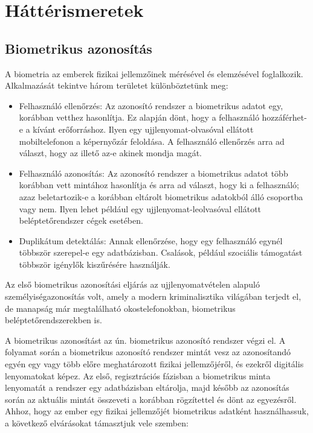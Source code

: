 \chapter{Háttérismeretek}

\section{Biometrikus azonosítás}

A biometria az emberek fizikai jellemzőinek mérésével és elemzésével foglalkozik. Alkalmazását tekintve három területet különböztetünk meg:

\begin{itemize}
	\item Felhasználó ellenőrzés: Az azonosító rendszer a biometrikus adatot egy, korábban vetthez hasonlítja. Ez alapján dönt, hogy a felhasználó hozzáférhet-e a kívánt erőforráshoz. Ilyen egy ujjlenyomat-olvasóval ellátott mobiltelefonon a képernyőzár feloldása. A felhasználó ellenőrzés arra ad választ, hogy az illető az-e akinek mondja magát.
	\item Felhasználó azonosítás: Az azonosító rendszer a biometrikus adatot több korábban vett mintához hasonlítja és arra ad választ, hogy ki a felhasználó; azaz beletartozik-e a korábban eltárolt biometrikus adatokból álló csoportba vagy nem. Ilyen lehet például egy ujjlenyomat-leolvasóval ellátott beléptetőrendszer cégek esetében.
	\item Duplikátum detektálás: Annak ellenőrzése, hogy egy felhasználó egynél többször szerepel-e egy adatbázisban. Csalások, például szociális támogatást többször igénylők kiszűrésére használják.
\end{itemize}

Az első biometrikus azonosítási eljárás az ujjlenyomatvételen alapuló személyiségazonosítás volt, amely a modern kriminalisztika világában terjedt el, de manapság már megtalálható okostelefonokban, biometrikus beléptetőrendszerekben is.

A biometrikus azonosítást az ún. biometrikus azonosító rendszer végzi el. A folyamat során a biometrikus azonosító rendszer mintát vesz az azonosítandó egyén egy vagy több előre meghatározott fizikai jellemzőjéről, és ezekről digitális lenyomatokat képez. Az első, regisztrációs fázisban a biometrikus minta lenyomatát a rendszer egy adatbázisban eltárolja, majd később az azonosítás során az aktuális mintát összeveti a korábban rögzítettel és dönt az egyezésről. Ahhoz, hogy az ember egy fizikai jellemzőjét biometrikus adatként használhassuk, a következő elvárásokat támasztjuk vele szemben:

